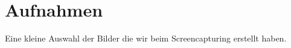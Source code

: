 %



\section{Aufnahmen}
\label{Anhang:Aufnahmen}

Eine kleine Auswahl der Bilder die wir beim Screencapturing erstellt haben.\\~\\


